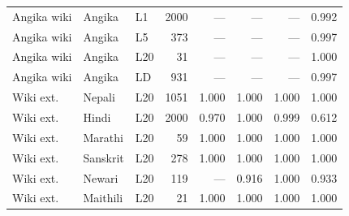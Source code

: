 \begin{tabular}{lllrrrrr}
Angika wiki & Angika & L1 & 2000 & --- & --- & --- & 0.992 \\
Angika wiki & Angika & L5 & 373 & --- & --- & --- & 0.997 \\
Angika wiki & Angika & L20 & 31 & --- & --- & --- & 1.000 \\
Angika wiki & Angika & LD & 931 & --- & --- & --- & 0.997 \\
Wiki ext. & Nepali & L20 & 1051 & 1.000 & 1.000 & 1.000 & 1.000 \\
Wiki ext. & Hindi & L20 & 2000 & 0.970 & 1.000 & 0.999 & 0.612 \\
Wiki ext. & Marathi & L20 & 59 & 1.000 & 1.000 & 1.000 & 1.000 \\
Wiki ext. & Sanskrit & L20 & 278 & 1.000 & 1.000 & 1.000 & 1.000 \\
Wiki ext. & Newari & L20 & 119 & --- & 0.916 & 1.000 & 0.933 \\
Wiki ext. & Maithili & L20 & 21 & 1.000 & 1.000 & 1.000 & 1.000 \\
\bottomrule
\end{tabular}
